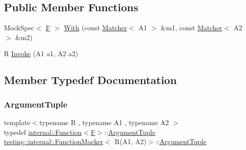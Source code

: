\subsection*{Public Member Functions}
\begin{DoxyCompactItemize}
\item 
Mock\+Spec$<$ \mbox{\hyperlink{classtesting_1_1internal_1_1FunctionMocker_3_01R_07A1_00_01A2_08_4_a61302610bfc9b30588ea345e468310b2}{F}} $>$ \mbox{\hyperlink{classtesting_1_1internal_1_1FunctionMocker_3_01R_07A1_00_01A2_08_4_a719a26a1389c51c175909d34175a9f0e}{With}} (const \mbox{\hyperlink{classtesting_1_1Matcher}{Matcher}}$<$ A1 $>$ \&m1, const \mbox{\hyperlink{classtesting_1_1Matcher}{Matcher}}$<$ A2 $>$ \&m2)
\item 
R \mbox{\hyperlink{classtesting_1_1internal_1_1FunctionMocker_3_01R_07A1_00_01A2_08_4_a518f5ac78887c64580343554aaae8f44}{Invoke}} (A1 a1, A2 a2)
\end{DoxyCompactItemize}


\subsection{Member Typedef Documentation}
\mbox{\label{classtesting_1_1internal_1_1FunctionMocker_3_01R_07A1_00_01A2_08_4_ae75e3ba40a99224f7363681914212c19}} 
\subsubsection{\texorpdfstring{ArgumentTuple}{ArgumentTuple}}
{\footnotesize\ttfamily template$<$typename R , typename A1 , typename A2 $>$ \\
typedef \mbox{\hyperlink{structtesting_1_1internal_1_1Function}{internal\+::\+Function}}$<$\mbox{\hyperlink{classtesting_1_1internal_1_1FunctionMocker_3_01R_07A1_00_01A2_08_4_a61302610bfc9b30588ea345e468310b2}{F}}$>$\+::\mbox{\hyperlink{classtesting_1_1internal_1_1FunctionMocker_3_01R_07A1_00_01A2_08_4_ae75e3ba40a99224f7363681914212c19}{Argument\+Tuple}} \mbox{\hyperlink{classtesting_1_1internal_1_1FunctionMocker}{testing\+::internal\+::\+Function\+Mocker}}$<$ R(A1, A2)$>$\+::\mbox{\hyperlink{classtesting_1_1internal_1_1FunctionMocker_3_01R_07A1_00_01A2_08_4_ae75e3ba40a99224f7363681914212c19}{Argument\+Tuple}}}

